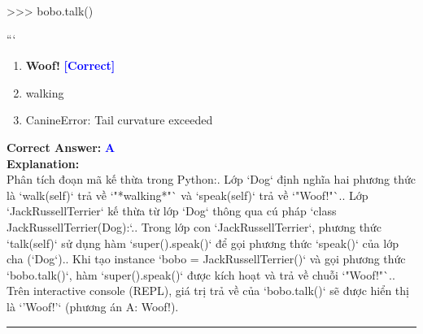 \documentclass[11pt,a4paper]{article}
\begin{document}
\begin{minipage}{\textwidth}
{\newline
>>> bobo.talk()\newline

\newline
```}

\begin{enumerate}[label=\Alph*.]
    \item \textbf{Woof!} \hfill \textcolor{blue}{\textbf{[Correct]}}
    \item walking
    \item CanineError: Tail curvature exceeded
\end{enumerate}

\noindent \textbf{Correct Answer:} \textcolor{blue}{\textbf{A}} \\[4pt]
\noindent \textbf{Explanation:}\\
Phân tích đoạn mã kế thừa trong Python:. Lớp `Dog` định nghĩa hai phương thức là `walk(self)` trả về `"*walking*"` và `speak(self)` trả về `"Woof!"`.. Lớp `JackRussellTerrier` kế thừa từ lớp `Dog` thông qua cú pháp `class JackRussellTerrier(Dog):`.. Trong lớp con `JackRussellTerrier`, phương thức `talk(self)` sử dụng hàm `super().speak()` để gọi phương thức `speak()` của lớp cha (`Dog`).. Khi tạo instance `bobo = JackRussellTerrier()` và gọi phương thức `bobo.talk()`, hàm `super().speak()` được kích hoạt và trả về chuỗi `"Woof!"`.. Trên interactive console (REPL), giá trị trả về của `bobo.talk()` sẽ được hiển thị là `'Woof!'` (phương án A: Woof!).
\end{minipage}
\vspace{0.8cm}
\hrule
\vspace{0.5cm}
\end{document}
